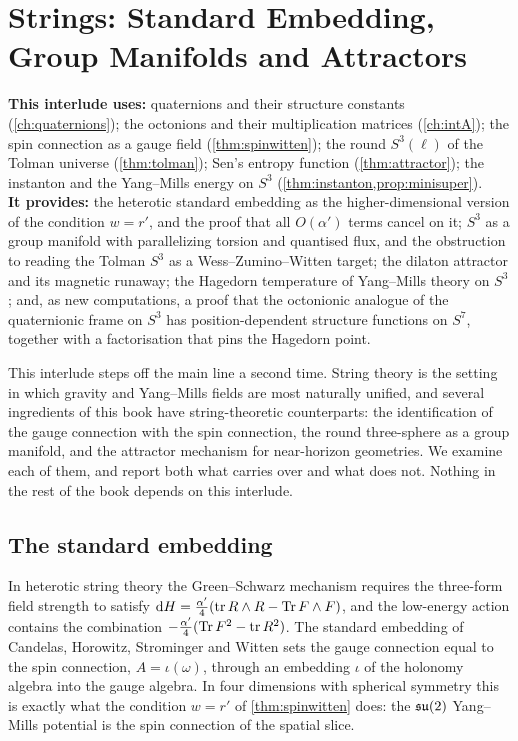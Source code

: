 \chapter[Strings: Standard Embedding, Group Manifolds and Attractors]{Strings: Standard Embedding,\\ Group Manifolds and Attractors}
\label{ch:intB}

\begin{usesbox}
\textbf{This interlude uses:} quaternions and their structure constants (\cref{ch:quaternions}); the octonions and their multiplication matrices (\cref{ch:intA}); the spin connection as a gauge field (\cref{thm:spinwitten}); the round $S^3(\ell)$ of the Tolman universe (\cref{thm:tolman}); Sen's entropy function (\cref{thm:attractor}); the instanton and the Yang--Mills energy on $S^3$ (\cref{thm:instanton,prop:minisuper}).\\
\textbf{It provides:} the heterotic standard embedding as the higher-dimensional version of the condition $w=r'$, and the proof that all $O(\alpha')$ terms cancel on it; $S^3$ as a group manifold with parallelizing torsion and quantised flux, and the obstruction to reading the Tolman $S^3$ as a Wess--Zumino--Witten target; the dilaton attractor and its magnetic runaway; the Hagedorn temperature of Yang--Mills theory on $S^3$; and, as new computations, a proof that the octonionic analogue of the quaternionic frame on $S^3$ has position-dependent structure functions on $S^7$, together with a factorisation that pins the Hagedorn point.
\end{usesbox}

This interlude steps off the main line a second time. String theory is the setting in which gravity and Yang--Mills fields are most naturally unified, and several ingredients of this book have string-theoretic counterparts: the identification of the gauge connection with the spin connection, the round three-sphere as a group manifold, and the attractor mechanism for near-horizon geometries. We examine each of them, and report both what carries over and what does not. Nothing in the rest of the book depends on this interlude.

\section{The standard embedding}

In heterotic string theory the Green--Schwarz mechanism requires the three-form field strength to satisfy $\mathrm{d} H=\frac{\alpha'}4(\operatorname{tr} R\wedge R-\operatorname{Tr} F\wedge F)$, and the low-energy action contains the combination $-\frac{\alpha'}4(\operatorname{Tr} F^2-\operatorname{tr} R^2)$. The standard embedding of Candelas, Horowitz, Strominger and Witten \cite{CHSW1985} sets the gauge connection equal to the spin connection, $A=\iota(\omega)$, through an embedding $\iota$ of the holonomy algebra into the gauge algebra. In four dimensions with spherical symmetry this is exactly what the condition $w=r'$ of \cref{thm:spinwitten} does: the $\mathfrak{su}(2)$ Yang--Mills potential is the spin connection of the spatial slice.

